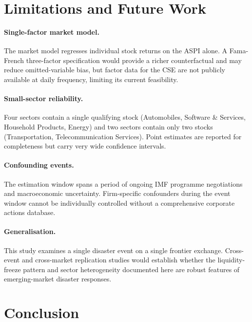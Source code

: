 \documentclass[sigconf, nonacm]{acmart}
\begin{document}
\section{Limitations and Future Work}

\paragraph{Single-factor market model.}
The market model regresses individual stock returns on the ASPI alone. A
Fama-French three-factor specification would provide a richer counterfactual
and may reduce omitted-variable bias, but factor data for the CSE are not
publicly available at daily frequency, limiting its current feasibility.

\paragraph{Small-sector reliability.}
Four sectors contain a single qualifying stock (Automobiles, Software \&
Services, Household Products, Energy) and two sectors contain only two
stocks (Transportation, Telecommunication Services). Point estimates are
reported for completeness but carry very wide confidence intervals.

\paragraph{Confounding events.}
The estimation window spans a period of ongoing IMF programme negotiations
and macroeconomic uncertainty. Firm-specific confounders during the event
window cannot be individually controlled without a comprehensive corporate
actions database.

\paragraph{Generalisation.}
This study examines a single disaster event on a single frontier exchange.
Cross-event and cross-market replication studies would establish whether the
liquidity-freeze pattern and sector heterogeneity documented here are robust
features of emerging-market disaster responses.

\section{Conclusion}
\end{document}
